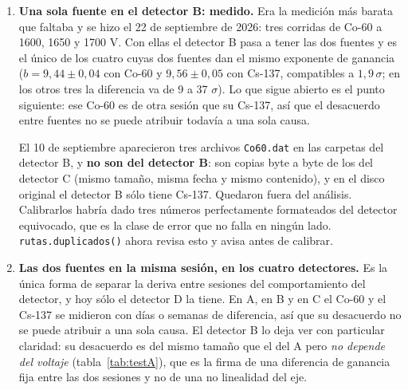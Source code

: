 \documentclass[11pt,a4paper]{article}
\begin{document}
\begin{enumerate}
\item \textbf{Una sola fuente en el detector B: medido.} Era la medición más
      barata que faltaba y se hizo el 22 de septiembre de 2026: tres corridas
      de Co-60 a 1600, 1650 y 1700 V. Con ellas el detector B pasa a tener las
      dos fuentes y es el único de los cuatro cuyas dos fuentes dan el mismo
      exponente de ganancia ($b = 9{,}44 \pm 0{,}04$ con Co-60 y
      $9{,}56 \pm 0{,}05$ con Cs-137, compatibles a $1{,}9\,\sigma$; en los
      otros tres la diferencia va de 9 a 37 $\sigma$). Lo que sigue abierto es
      el punto siguiente: ese Co-60 es de otra sesión que su Cs-137, así que el
      desacuerdo entre fuentes no se puede atribuir todavía a una sola causa.

      \begin{aviso}
      El 10 de septiembre aparecieron tres archivos \texttt{Co60.dat} en las
      carpetas del detector B, y \textbf{no son del detector B}: son copias
      byte a byte de los del detector C (mismo tamaño, misma fecha y mismo
      contenido), y en el disco original el detector B sólo tiene Cs-137.
      Quedaron fuera del análisis. Calibrarlos habría dado tres números
      perfectamente formateados del detector equivocado, que es la clase de
      error que no falla en ningún lado. \texttt{rutas.duplicados()} ahora
      revisa esto y avisa antes de calibrar.
      \end{aviso}

\item \textbf{Las dos fuentes en la misma sesión, en los cuatro detectores.}
      Es la única forma de separar la deriva entre sesiones del comportamiento
      del detector, y hoy sólo el detector D la tiene. En A, en B y en C el
      Co-60 y el Cs-137 se midieron con días o semanas de diferencia, así que
      su desacuerdo no se puede atribuir a una sola causa. El detector B lo
      deja ver con particular claridad: su desacuerdo es del mismo tamaño que
      el del A pero \emph{no depende del voltaje} (tabla~\ref{tab:testA}),
      que es la firma de una diferencia de ganancia fija entre las dos
      sesiones y no de una no linealidad del eje.


\end{enumerate}
\end{document}

